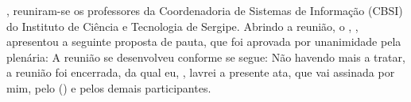 \documentclass[12pt,a4paper]{ata}
\begin{document}
%
\label{Introdução da ata}
\hojeporextenso, reuniram-se \tiporeuniaoadv{} os professores da Coordenadoria de Sistemas de Informação (CBSI) do Instituto de Ciência e Tecnologia de Sergipe.
%
\presentes
%
%
\justificados
%
\ausentes
%
Abrindo a reunião, o \prof \presidiu, \cargopresidiu, apresentou a
seguinte proposta de pauta, que foi aprovada por unanimidade pela
plenária:
%
\pauta
%
A reunião se desenvolveu conforme se segue:
% 
\desenvolvimento
% 
Não havendo mais a tratar, a reunião foi encerrada, da qual eu,
\secretariou, lavrei a presente ata, que vai assinada por mim, pelo 
\cargopresidiu \space (\presidiu) e pelos demais participantes.
%

\imprimirRegiaoAssinaturaPresentes
\end{document}
